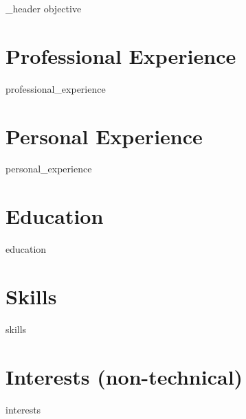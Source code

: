 \documentclass[letter,10pt]{article}
\begin{document}
{_header}
{objective}

\section{Professional Experience}
{professional_experience}

\section{Personal Experience}
{personal_experience}

\section{Education}
{education}

\section{Skills}
{skills}


\section{Interests (non-technical)}
{interests}
\end{document}
